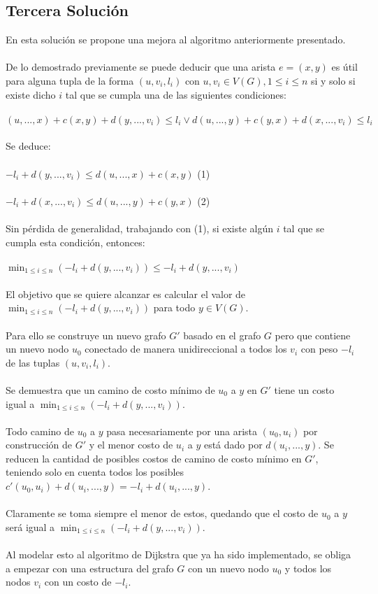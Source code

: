 \documentclass{article}
\begin{document}
\subsection{Tercera Solución}
En esta solución se propone una mejora al algoritmo anteriormente presentado.
\\
\\
De lo demostrado previamente se puede deducir que una arista $e=(x,y)$ es útil para alguna tupla de la forma $(u, v_i, l_i)$ con $u, v_i \in V(G), 1 \leq i \leq n$ si y solo si existe dicho $i$ tal que se cumpla una de las siguientes condiciones:
\\
\\
$(u,...,x) + c(x,y) + d(y,...,v_i) \leq l_i \vee d(u,...,y) + c(y,x) + d(x,...,v_i) \leq l_i$
\\
\\
Se deduce:
\\
\\
$-l_i + d(y,...,v_i) \leq d(u,...,x) + c(x,y)$ (1)
\\
\\
$-l_i + d(x,...,v_i) \leq d(u,...,y) + c(y,x)$ (2)
\\
\\
Sin pérdida de generalidad, trabajando con (1), si existe algún $i$ tal que se cumpla esta condición, entonces:
\\
\\
$\min_{1 \leq i \leq n} (-l_i + d(y,...,v_i)) \leq -l_i + d(y,...,v_i)$
\\
\\
El objetivo que se quiere alcanzar es calcular el valor de $\min_{1 \leq i \leq n} (-l_i + d(y,...,v_i))$ para todo $y \in V(G)$.
\\
\\
Para ello se construye un nuevo grafo $G'$ basado en el grafo $G$ pero que contiene un nuevo nodo $u_0$ conectado de manera unidireccional a todos los $v_i$ con peso $-l_i$ de las tuplas $(u,v_i, l_i)$.
\\
\\
Se demuestra que un camino de costo mínimo de $u_0$ a $y$ en $G'$ tiene un costo igual a $\min_{1 \leq i \leq n} (-l_i + d(y,...,v_i))$.
\\
\\
Todo camino de $u_0$ a $y$ pasa necesariamente por una arista $(u_0, u_i)$ por construcción de $G'$ y el menor costo de $u_i$ a $y$ está dado por $d(u_i,...,y)$. Se reducen la cantidad de posibles costos de camino de costo mínimo en $G'$, teniendo solo en cuenta todos los posibles $c'(u_0, u_i) + d(u_i,...,y) = -l_i + d(u_i,...,y)$.
\\
\\
Claramente se toma siempre el menor de estos, quedando que el costo de $u_0$ a $y$ será igual a $\min_{1 \leq i \leq n} (-l_i + d(y,...,v_i))$.
\\
\\
Al modelar esto al algoritmo de Dijkstra que ya ha sido implementado, se obliga a empezar con una estructura del grafo $G$ con un nuevo nodo $u_0$ y todos los nodos $v_i$ con un costo de $-l_i$.
\end{document}

